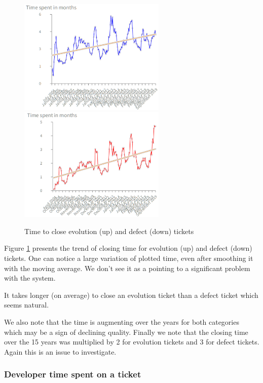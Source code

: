 \documentclass[10pt,conference]{IEEEtran}
\begin{document}
\begin{figure}[htbp]
  \centering
  \includegraphics[width=70mm]{./images/openCloseEvol.png} \\
  \includegraphics[width=70mm]{./images/openCloseBug.png}
  \caption{Time to close evolution (up) and defect (down) tickets}
  \label{fig:closingTime}
\end{figure}

Figure \ref{fig:closingTime} presents the trend of closing time for evolution (up) and defect (down) tickets.
One can notice a large variation of plotted time, even after smoothing it with the moving average. 
We don't see it as a pointing to a significant problem with the system.


It takes longer (on average) to close an evolution ticket than a defect ticket which seems natural.

We also note that the time is augmenting over the years for both categories which may be a sign of declining quality.
Finally we note that the closing time over the 15 years was multiplied by 2 for evolution tickets and 3 for defect tickets.
Again this is an issue to investigate.


\subsubsection{Developer time spent on a ticket}
\end{document}

